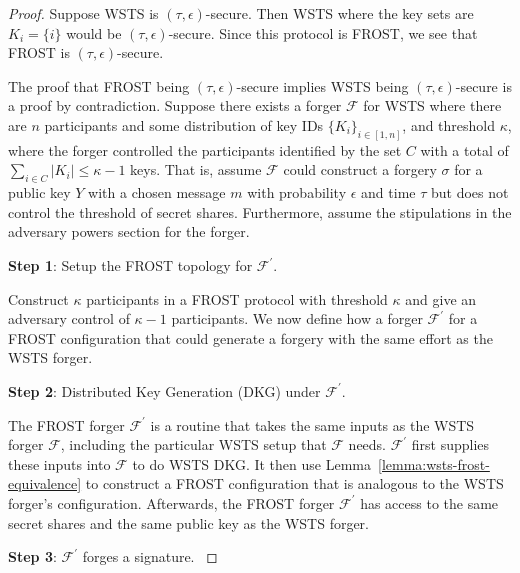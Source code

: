 \documentclass{article}
\newenvironment{setup}[1]{\vspace{1mm}\textbf{#1}:}{\vspace{1mm}}
\theoremstyle{definition}
\theoremstyle{remark}
\begin{document}
\begin{proof}
Suppose WSTS is $(\tau, \epsilon)$-secure. Then WSTS where the key sets are $K_i = \{i\}$ would be $(\tau, \epsilon)$-secure. Since this protocol is FROST, we see that FROST is $(\tau, \epsilon)$-secure.

The proof that FROST being $(\tau, \epsilon)$-secure implies WSTS being $(\tau, \epsilon)$-secure is a proof by contradiction. Suppose there exists a forger $\mathcal{F}$ for WSTS where there are $n$ participants and some distribution of key IDs $\{ K_i\}_{i\in [1, n]}$, and threshold $\kappa$, where the forger controlled the participants identified by the set $C$ with a total of $\sum_{i \in C}|K_i| \leq \kappa - 1$ keys. That is, assume $\mathcal{F}$ could construct a forgery $\sigma$ for a public key $Y$ with a chosen message $m$ with probability $\epsilon$ and time $\tau$ but does not control the threshold of secret shares. Furthermore, assume the stipulations in the adversary powers section for the forger.

\begin{setup}{Step 1}
    Setup the FROST topology for $\mathcal{F}^\prime$.
\end{setup}

Construct $\kappa$ participants in a FROST protocol with threshold $\kappa$ and give an adversary control of $\kappa - 1$ participants. We now define how a forger $\mathcal{F}^\prime$ for a FROST configuration that could generate a forgery with the same effort as the WSTS forger.

\begin{setup}{Step 2}
    Distributed Key Generation (DKG) under $\mathcal{F}^\prime$.
\end{setup}

The FROST forger $\mathcal{F}^\prime$ is a routine that takes the same inputs as the WSTS forger $\mathcal{F}$, including the particular WSTS setup that $\mathcal{F}$ needs. $\mathcal{F}^\prime$ first supplies these inputs into $\mathcal{F}$ to do WSTS DKG. It then use Lemma~\ref{lemma:wsts-frost-equivalence} to construct a FROST configuration that is analogous to the WSTS forger's configuration. Afterwards, the FROST forger $\mathcal{F}^\prime$ has access to the same secret shares and the same public key as the WSTS forger.

\begin{setup}{Step 3}
    $\mathcal{F}^\prime$ forges a signature.
\end{setup}


\end{proof}
\end{document}
